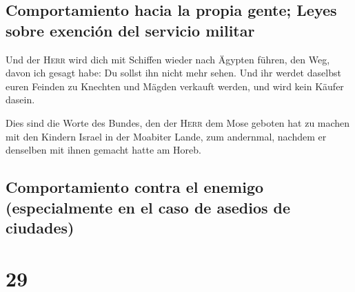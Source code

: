 \hypertarget{comportamiento-hacia-la-propia-gente-leyes-sobre-exenciuxf3n-del-servicio-militar}{%
\subsection{Comportamiento hacia la propia gente; Leyes sobre exención
del servicio
militar}\label{comportamiento-hacia-la-propia-gente-leyes-sobre-exenciuxf3n-del-servicio-militar}}

 Und der \textsc{Herr} wird dich mit Schiffen wieder nach
Ägypten führen, den Weg, davon ich gesagt habe: Du sollst ihn nicht mehr
sehen. Und ihr werdet daselbst euren Feinden zu Knechten und Mägden
verkauft werden, und wird kein Käufer dasein.

 Dies sind die Worte des Bundes, den der \textsc{Herr}
dem Mose geboten hat zu machen mit den Kindern Israel in der Moabiter
Lande, zum andernmal, nachdem er denselben mit ihnen gemacht hatte am
Horeb.

\hypertarget{comportamiento-contra-el-enemigo-especialmente-en-el-caso-de-asedios-de-ciudades}{%
\subsection{Comportamiento contra el enemigo (especialmente en el caso
de asedios de
ciudades)}\label{comportamiento-contra-el-enemigo-especialmente-en-el-caso-de-asedios-de-ciudades}}

\hypertarget{section-28}{%
\section{29}\label{section-28}}

